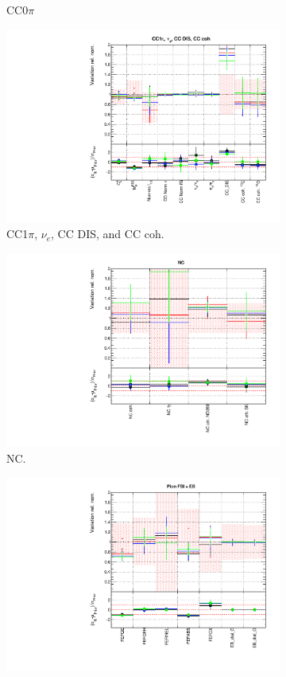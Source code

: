 \begin{figure}[!htbp]
\begin{subfigure}{0.49\textwidth}
  \caption{CC0$\pi$}
\end{subfigure}
\begin{subfigure}{0.49\textwidth}
  \centering
  \includegraphics[width=0.95\linewidth]{figs/detcovbinxsec_2}
  \caption{CC1$\pi$, $\nu_e$, CC DIS, and CC coh.}
\end{subfigure}
\begin{subfigure}{0.49\textwidth}
  \centering
  \includegraphics[width=0.95\linewidth]{figs/detcovbinxsec_3}
  \caption{NC.}
\end{subfigure}
\begin{subfigure}{0.49\textwidth}
  \centering
  \includegraphics[width=0.95\linewidth]{figs/detcovbinxsec_4}

\end{subfigure}
\end{figure}
